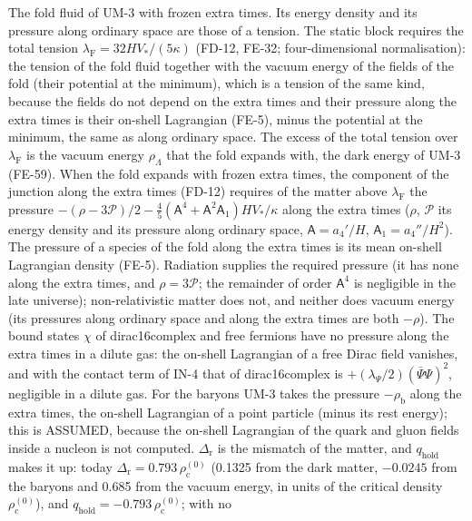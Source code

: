 \documentclass[
  10pt,
]{article}
\begin{document}
The fold fluid of UM-3 with frozen extra times. Its energy density and
its pressure along ordinary space are those of a tension. The static
block requires the total tension
\(\lambda_{\mathrm{F}} = 32HV_*/(5\kappa)\) (FD-12, FE-32;
four-dimensional normalisation): the tension of the fold fluid together
with the vacuum energy of the fields of the fold (their potential at the
minimum), which is a tension of the same kind, because the fields do not
depend on the extra times and their pressure along the extra times is
their on-shell Lagrangian (FE-5), minus the potential at the minimum,
the same as along ordinary space. The excess of the total tension over
\(\lambda_{\mathrm{F}}\) is the vacuum energy \(\rho_\Lambda\) that the
fold expands with, the dark energy of UM-3 (FE-59). When the fold
expands with frozen extra times, the component of the junction along the
extra times (FD-12) requires of the matter above
\(\lambda_{\mathrm{F}}\) the pressure
\(-(\rho - 3\mathcal{P})/2 - \frac45(\mathsf{A}^4 + \mathsf{A}^2\mathsf{A}_1)HV_*/\kappa\)
along the extra times (\(\rho\), \(\mathcal{P}\) its energy density and
its pressure along ordinary space, \(\mathsf{A} = a_4'/H\),
\(\mathsf{A}_1 = a_4''/H^2\)). The pressure of a species of the fold
along the extra times is its mean on-shell Lagrangian density (FE-5).
Radiation supplies the required pressure (it has none along the extra
times, and \(\rho = 3\mathcal{P}\); the remainder of order
\(\mathsf{A}^4\) is negligible in the late universe); non-relativistic
matter does not, and neither does vacuum energy (its pressures along
ordinary space and along the extra times are both \(-\rho\)). The bound
states \(\chi\) of dirac16complex and free fermions have no pressure
along the extra times in a dilute gas: the on-shell Lagrangian of a free
Dirac field vanishes, and with the contact term of IN-4 that of
dirac16complex is \(+(\lambda_\Psi/2)(\bar\Psi\Psi)^2\), negligible in a
dilute gas. For the baryons UM-3 takes the pressure
\(-\rho_{\mathrm{b}}\) along the extra times, the on-shell Lagrangian of
a point particle (minus its rest energy); this is ASSUMED, because the
on-shell Lagrangian of the quark and gluon fields inside a nucleon is
not computed. \(\Delta_{\mathrm{r}}\) is the mismatch of the matter, and
\(q_{\mathrm{hold}}\) makes it up: today
\(\Delta_{\mathrm{r}} = 0.793\,\rho_{\mathrm{c}}^{(0)}\) (0.1325 from
the dark matter, \(-0.0245\) from the baryons and 0.685 from the vacuum
energy, in units of the critical density \(\rho_{\mathrm{c}}^{(0)}\)),
and \(q_{\mathrm{hold}} = -0.793\,\rho_{\mathrm{c}}^{(0)}\); with no
\end{document}
